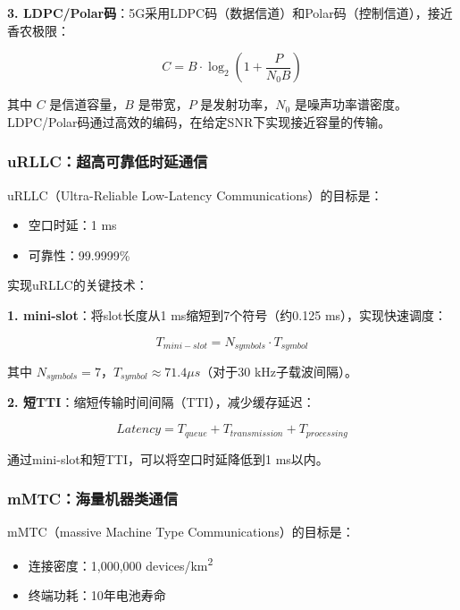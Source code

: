 \textbf{3. LDPC/Polar码}：5G采用LDPC码（数据信道）和Polar码（控制信道），接近香农极限：

\begin{equation}
C = B \cdot \log_2(1 + \frac{P}{N_0 B})
\end{equation}

其中 $C$ 是信道容量，$B$ 是带宽，$P$ 是发射功率，$N_0$ 是噪声功率谱密度。LDPC/Polar码通过高效的编码，在给定SNR下实现接近容量的传输。

\subsubsection{uRLLC：超高可靠低时延通信}

uRLLC（Ultra-Reliable Low-Latency Communications）的目标是：

\begin{itemize}
    \item 空口时延：1 ms
    \item 可靠性：99.9999\%
\end{itemize}

实现uRLLC的关键技术：

\textbf{1. mini-slot}：将slot长度从1 ms缩短到7个符号（约0.125 ms），实现快速调度：

\begin{equation}
T_{mini-slot} = N_{symbols} \cdot T_{symbol}
\end{equation}

其中 $N_{symbols} = 7$，$T_{symbol} \approx 71.4 \mu s$（对于30 kHz子载波间隔）。

\textbf{2. 短TTI}：缩短传输时间间隔（TTI），减少缓存延迟：

\begin{equation}
Latency = T_{queue} + T_{transmission} + T_{processing}
\end{equation}

通过mini-slot和短TTI，可以将空口时延降低到1 ms以内。

\subsubsection{mMTC：海量机器类通信}

mMTC（massive Machine Type Communications）的目标是：

\begin{itemize}
    \item 连接密度：1,000,000 devices/km\textsuperscript{2}
    \item 终端功耗：10年电池寿命
\end{itemize}

